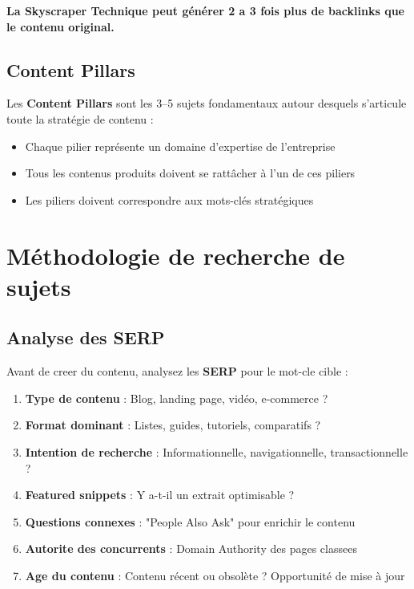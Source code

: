 \documentclass[12pt,a4paper,twoside]{report}
\newcommand{\keyword}[1]{\textbf{\textcolor{googleblue}{#1}}}
\newcommand{\important}[1]{\textbf{\textcolor{googlered}{#1}}}
\begin{document}
\important{La Skyscraper Technique peut générer 2 a 3 fois plus de backlinks que le contenu original.}

\subsection{Content Pillars}

Les \keyword{Content Pillars} sont les 3--5 sujets fondamentaux autour desquels s'articule toute la stratégie de contenu :

\begin{itemize}
    \item Chaque pilier représente un domaine d'expertise de l'entreprise
    \item Tous les contenus produits doivent se rattâcher à l'un de ces piliers
    \item Les piliers doivent correspondre aux mots-clés stratégiques
\end{itemize}

\section{Méthodologie de recherche de sujets}

\subsection{Analyse des SERP}

Avant de creer du contenu, analysez les \keyword{SERP} pour le mot-cle cible :

\begin{enumerate}
    \item \textbf{Type de contenu} : Blog, landing page, vidéo, e-commerce ?
    \item \textbf{Format dominant} : Listes, guides, tutoriels, comparatifs ?
    \item \textbf{Intention de recherche} : Informationnelle, navigationnelle, transactionnelle ?
    \item \textbf{Featured snippets} : Y a-t-il un extrait optimisable ?
    \item \textbf{Questions connexes} : "People Also Ask" pour enrichir le contenu
    \item \textbf{Autorite des concurrents} : Domain Authority des pages classees
    \item \textbf{Age du contenu} : Contenu récent ou obsolète ? Opportunité de mise à jour
\end{enumerate}
\end{document}
